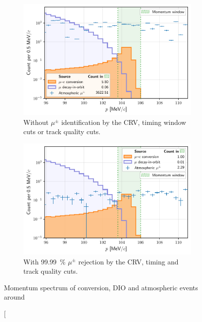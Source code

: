\begin{figure}
    \begin{subfigure}[t]{0.49\textwidth}
        \centering
        \includegraphics[width=\textwidth]{
            chapter6/thesis_conversion_search_momentum_distribution_nocuts_v5.pdf}
            \caption{ Without $\mu^\pm$ identification by the CRV, timing window
            cuts or track quality cuts. }
        \label{fig:log_spectrum_nocuts}
    \end{subfigure}
    \hfill
    \begin{subfigure}[t]{0.49\textwidth}
        \centering
        \includegraphics[width=\textwidth]{chapter6/thesis_conversion_search_momentum_distribution_withcuts_except_directionID.pdf}
        \caption{ With \SI{99.99}{\percent} $\mu^\pm$ rejection by the CRV,
        timing and track quality cuts. }
        \label{fig:log_spectrum_cuts_except_directionID}
    \end{subfigure}
    \caption[Momentum spectrum of conversion, DIO and atmospheric events around

\end{figure}
